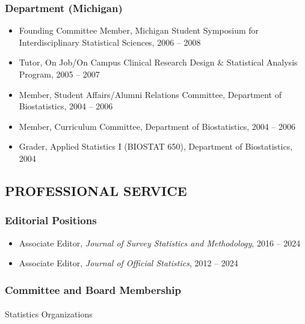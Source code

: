 \documentclass[
  english,
  letterpaper,
  DIV=11,
  numbers=noendperiod]{scrartcl}
\makeatletter
\let\oldparagraph\paragraph
\renewcommand{\paragraph}{
    \@ifstar
      \xxxParagraphStar
      \xxxParagraphNoStar
  }
\newcommand{\xxxParagraphStar}[1]{\oldparagraph*{#1}\mbox{}}
\newcommand{\xxxParagraphNoStar}[1]{\oldparagraph{#1}\mbox{}}
\providecommand{\tightlist}{%
  \setlength{\itemsep}{0pt}\setlength{\parskip}{0pt}}
\makeatother
\begin{document}
\subsubsection{Department (Michigan)}\label{department-michigan}

\begin{itemize}
\tightlist
\item
  Founding Committee Member, Michigan Student Symposium for
  Interdisciplinary Statistical Sciences, 2006 -- 2008
\item
  Tutor, On Job/On Campus Clinical Research Design \& Statistical
  Analysis Program, 2005 -- 2007
\item
  Member, Student Affairs/Alumni Relations Committee, Department of
  Biostatistics, 2004 -- 2006
\item
  Member, Curriculum Committee, Department of Biostatistics, 2004 --
  2006
\item
  Grader, Applied Statistics I (BIOSTAT 650), Department of
  Biostatistics, 2004
\end{itemize}

\subsection{PROFESSIONAL SERVICE}\label{professional-service}

\subsubsection{Editorial Positions}\label{editorial-positions}

\begin{itemize}
\tightlist
\item
  Associate Editor, \emph{Journal of Survey Statistics and Methodology},
  2016 -- 2024
\item
  Associate Editor, \emph{Journal of Official Statistics}, 2012 -- 2024
\end{itemize}

\subsubsection{Committee and Board
Membership}\label{committee-and-board-membership}

\paragraph{Statistics Organizations}\label{statistics-organizations}
\end{document}

